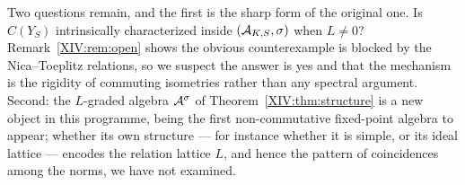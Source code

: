 Two questions remain, and the first is the sharp form of the original one. Is $C(Y_S)$
intrinsically characterized inside $(\mathcal{A}_{K,S},\sigma)$ when $L\ne0$? Remark~\ref{XIV:rem:open}
shows the obvious counterexample is blocked by the Nica--Toeplitz relations, so we suspect
the answer is yes and that the mechanism is the rigidity of commuting isometries rather than
any spectral argument. Second: the $L$-graded algebra $\mathcal{A}^\sigma$ of
Theorem~\ref{XIV:thm:structure} is a new object in this programme, being the first non-commutative
fixed-point algebra to appear; whether its own structure --- for instance whether it is
simple, or its ideal lattice --- encodes the relation lattice $L$, and hence the pattern of
coincidences among the norms, we have not examined.

